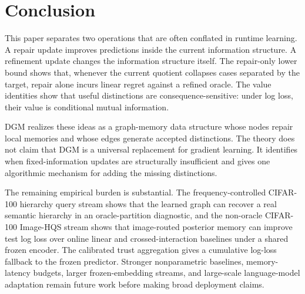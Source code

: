 \section{Conclusion}
\label{sec:conclusion}

This paper separates two operations that are often conflated in runtime learning. A repair update improves predictions inside the current information structure. A refinement update changes the information structure itself. The repair-only lower bound shows that, whenever the current quotient collapses cases separated by the target, repair alone incurs linear regret against a refined oracle. The value identities show that useful distinctions are consequence-sensitive: under log loss, their value is conditional mutual information.

DGM realizes these ideas as a graph-memory data structure whose nodes repair local memories and whose edges generate accepted distinctions. The theory does not claim that DGM is a universal replacement for gradient learning. It identifies when fixed-information updates are structurally insufficient and gives one algorithmic mechanism for adding the missing distinctions.

The remaining empirical burden is substantial. The frequency-controlled CIFAR-100 hierarchy query stream shows that the learned graph can recover a real semantic hierarchy in an oracle-partition diagnostic, and the non-oracle CIFAR-100 Image-HQS stream shows that image-routed posterior memory can improve test log loss over online linear and crossed-interaction baselines under a shared frozen encoder. The calibrated trust aggregation gives a cumulative log-loss fallback to the frozen predictor. Stronger nonparametric baselines, memory-latency budgets, larger frozen-embedding streams, and large-scale language-model adaptation remain future work before making broad deployment claims.
